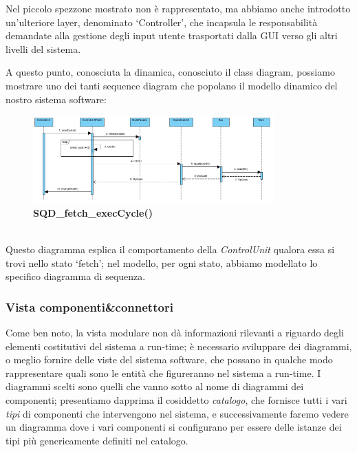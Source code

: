 \documentclass[11pt]{article}
\begin{document}
Nel piccolo spezzone mostrato non è rappresentato, ma abbiamo anche introdotto un'ulteriore layer, denominato `Controller', che incapsula le responsabilità demandate alla gestione degli input utente trasportati dalla GUI verso gli altri livelli del sistema.

A questo punto, conosciuta la dinamica, conosciuto il class diagram, possiamo mostrare uno dei tanti sequence diagram che popolano il modello dinamico del nostro sistema software:
\begin{figure}[h]
\hspace*{-1cm}
\centering
\includegraphics[width=350px, height=127px]{SQD_fetch_execCycle().png}\\
\small\textbf{SQD\_fetch\_execCycle()}
\end{figure}\\
Questo diagramma esplica il comportamento della \emph{ControlUnit} qualora essa si trovi nello stato `fetch'; nel modello, per ogni stato, abbiamo modellato lo specifico diagramma di sequenza.
\clearpage
\subsubsection{Vista componenti\&connettori}
Come ben noto, la vista modulare non dà informazioni rilevanti a riguardo degli elementi costitutivi del sistema a run-time; è necessario sviluppare dei diagrammi, o meglio fornire delle viste del sistema software, che possano in qualche modo rappresentare quali sono le entità che figureranno nel sistema a run-time. I diagrammi scelti sono quelli che vanno sotto al nome di diagrammi dei componenti; presentiamo dapprima il cosiddetto \emph{catalogo}, che fornisce tutti i vari \emph{tipi} di componenti che intervengono nel sistema, e successivamente faremo vedere un diagramma dove i vari componenti si configurano per essere delle istanze dei tipi più genericamente definiti nel catalogo. 
\end{document}
